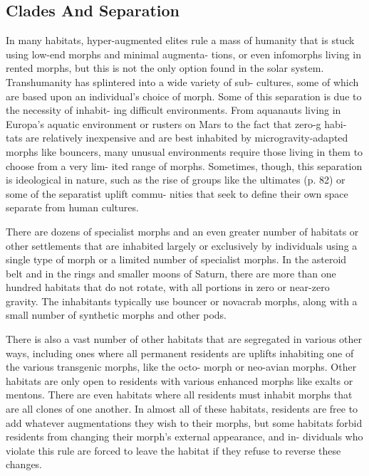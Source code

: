 \subsection{Clades And Separation}

In many habitats, hyper-augmented elites 
rule a mass of humanity that is stuck using 
low-end morphs and minimal augmenta-
tions, or even infomorphs living in rented 
morphs, but this is not the only option 
found in the solar system. Transhumanity 
has splintered into a wide variety of sub-
cultures, some of which are based upon an 
individual's choice of morph. Some of this 
separation is due to the necessity of inhabit-
ing difficult environments. From aquanauts 
living in Europa's aquatic environment or 
rusters on Mars to the fact that zero-g habi-
tats are relatively inexpensive and are best 
inhabited by microgravity-adapted morphs 
like bouncers, many unusual environments 
require those living in them to choose from a very lim-
ited range of morphs. Sometimes, though, this separation 
is ideological in nature, such as the rise of groups like the 
ultimates (p. 82) or some of the separatist uplift commu-
nities that seek to define their own space separate from 
human cultures.

There are dozens of specialist morphs and an even 
greater number of habitats or other settlements that 
are inhabited largely or exclusively by individuals 
using a single type of morph or a limited number of 
specialist morphs. In the asteroid belt and in the rings 
and smaller moons of Saturn, there are more than one 
hundred habitats that do not rotate, with all portions 
in zero or near-zero gravity. The inhabitants typically 
use bouncer or novacrab morphs, along with a small 
number of synthetic morphs and other pods.

There is also a vast number of other habitats that 
are segregated in various other ways, including ones 
where all permanent residents are uplifts inhabiting 
one of the various transgenic morphs, like the octo-
morph or neo-avian morphs. Other habitats are only 
open to residents with various enhanced morphs like 
exalts or mentons. There are even habitats where all 
residents must inhabit morphs that are all clones of 
one another. In almost all of these habitats, residents 
are free to add whatever augmentations they wish to 
their morphs, but some habitats forbid residents from 
changing their morph's external appearance, and in-
dividuals who violate this rule are forced to leave the 
habitat if they refuse to reverse these changes.

